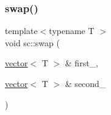 \mbox{\label{namespacesc_ac8c8a40b2448b8d340e7d5019dc6fc70}} 
\subsubsection{\texorpdfstring{swap()}{swap()}}
{\footnotesize\ttfamily template$<$typename T $>$ \\
void sc\+::swap (\begin{DoxyParamCaption}\item[{\hyperlink{classsc_1_1vector}{vector}$<$ T $>$ \&}]{first\+\_\+,  }\item[{\hyperlink{classsc_1_1vector}{vector}$<$ T $>$ \&}]{second\+\_\+ }\end{DoxyParamCaption})}

